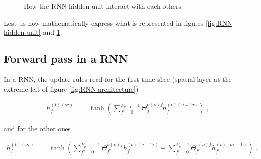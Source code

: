 \begin{figure}[H]
\begin{center}
\caption{\label{fig:RNN interaction}How the RNN hidden unit interact with each others}
\end{center}
\end{figure}


Lest us now mathematically express what is represented in figures \ref{fig:RNN hidden unit} and \ref{fig:RNN interaction}.

\subsection{Forward pass in a RNN}

 In a RNN, the update rules read for the first time slice (spatial layer at the extreme left of figure \ref{fig:RNN architecture})

\begin{align}
h^{(t)(\nu\tau)}_f&=\tanh\left(\sum_{f'=0}^{F_{{\nu-1}}-1}\Theta^{\nu(\nu)f}_{f'}
%
h^{(t)(\nu-1\tau)}_{f'}\right)\;,
\end{align}

and for the other ones

\begin{align}
h^{(t)(\nu\tau)}_f&=\tanh\left(\sum_{f'=0}^{F_{{\nu-1}}-1}\Theta^{\nu(\nu)f}_{f'}
%
h^{(t)(\nu-1\tau)}_{f'}+\sum_{f'=0}^{F_{{\nu}}-1}\Theta^{\tau(\nu)f}_{f'}
%
h^{(t)(\nu\tau-1)}_{f'}\right)\;.
\end{align}

